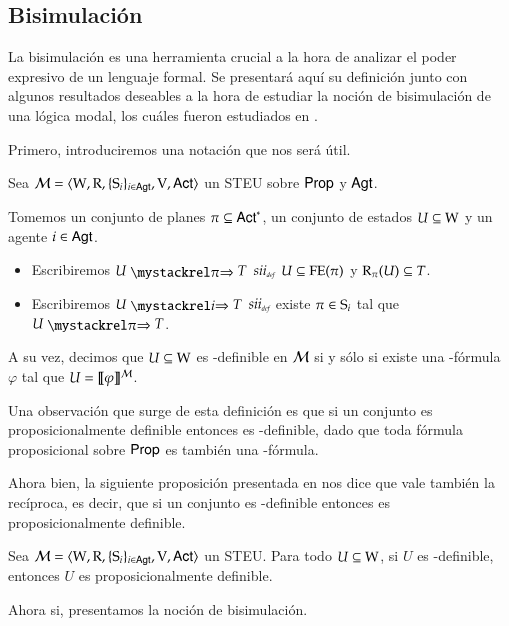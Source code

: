 \subsection[short]{Bisimulación}

La bisimulación es una herramienta crucial a la hora de analizar el poder expresivo de un lenguaje formal. Se presentará aquí su definición junto con algunos resultados 
deseables a la hora de estudiar la noción de bisimulación de una lógica modal, los cuáles fueron estudiados en \cite{ArecesFSV25}.

Primero, introduciremos una notación que nos será útil.

\begin{definicion}
    Sea $\model=\tup{\W,\R,\cset{\S_i}_{i \in \AGT},\V,\ACT}$ un STEU sobre $\PROP$ y $\AGT$.

    Tomemos un conjunto de planes $\pi \subseteq \ACT^*$, un conjunto de estados $U \subseteq \W$ y un agente $i \in \AGT$.
    \begin{itemize}
        \item Escribiremos $U \ultsExecStrat{\pi} T$ $\iffdef$ $U \subseteq \feexec(\pi)$ y $\R_\pi(U) \subseteq T$.
        \item Escribiremos $U \ultsExecAgi T$ $\iffdef$ existe $\pi \in \S_i$ tal que $U \ultsExecStrat{\pi} T$.
    \end{itemize}
    A su vez, decimos que $U \subseteq \W$ es \KHilogic-definible en $\modults$ si y sólo si existe una \KHilogic-fórmula $\varphi$ tal que
    $U = \truthset{\modults}{\varphi}$.
\end{definicion}

Una observación que surge de esta definición es que si un conjunto es proposicionalmente definible entonces es \KHilogic-definible, dado que 
toda fórmula proposicional sobre $\PROP$ es también una \KHilogic-fórmula.

Ahora bien, la siguiente proposición presentada en \cite{ArecesFSV25} nos dice que vale también la recíproca, 
es decir, que si un conjunto es \KHilogic-definible entonces es proposicionalmente definible.

\begin{proposicion}
    Sea $\model=\tup{\W,\R,\cset{\S_i}_{i \in \AGT},\V,\ACT}$ un STEU. Para todo $U \subseteq \W$, si $U$ es \KHilogic-definible, entonces $U$ es proposicionalmente definible.
\end{proposicion}

Ahora si, presentamos la noción de bisimulación.

